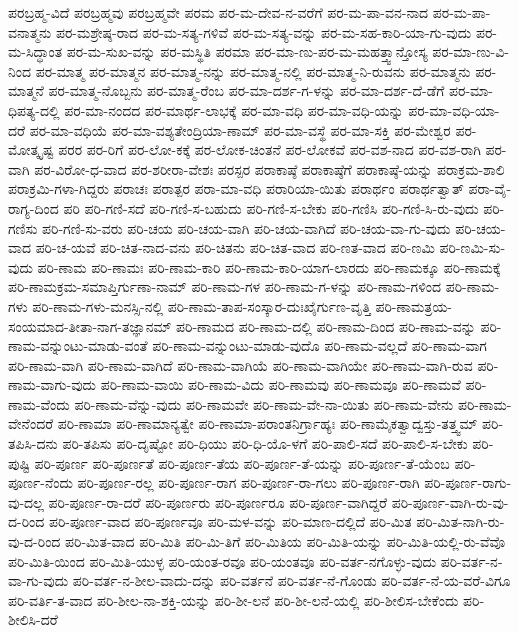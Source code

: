 {ಪರಬ್ರಹ್ಮ-ವಿದೆ
ಪರಬ್ರಹ್ಮವು
ಪರಬ್ರಹ್ಮವೇ
ಪರಮ
ಪರ-ಮ-ದೇವ-ನ-ವರೆಗೆ
ಪರ-ಮ-ಪಾ-ವನ-ನಾದ
ಪರ-ಮ-ಪಾ-ವನಾತ್ಮನು
ಪರ-ಮಶ್ರೇಷ್ಠ-ರಾದ
ಪರ-ಮ-ಸತ್ಯ-ಗಳಿವೆ
ಪರ-ಮ-ಸತ್ಯ-ವನ್ನು
ಪರ-ಮ-ಸಹ-ಕಾರಿ-ಯಾ-ಗು-ವುದು
ಪರ-ಮ-ಸಿದ್ಧಾಂತ
ಪರ-ಮ-ಸುಖ-ವನ್ನು
ಪರ-ಮಸ್ಥಿತಿ
ಪರಮಾ
ಪರ-ಮಾ-ಣು-ಪರ-ಮ-ಮಹತ್ತ್ವಾನ್ತೋಸ್ಯ
ಪರ-ಮಾ-ಣು-ವಿ-ನಿಂದ
ಪರ-ಮಾತ್ಮ
ಪರ-ಮಾತ್ಮನ
ಪರ-ಮಾತ್ಮ-ನನ್ನು
ಪರ-ಮಾತ್ಮ-ನಲ್ಲಿ
ಪರ-ಮಾತ್ಮ-ನಿ-ರುವನು
ಪರ-ಮಾತ್ಮನು
ಪರ-ಮಾತ್ಮನೆ
ಪರ-ಮಾತ್ಮ-ನೊಬ್ಬನು
ಪರ-ಮಾತ್ಮ-ರೆಂಬ
ಪರ-ಮಾ-ದರ್ಶ-ಗ-ಳನ್ನು
ಪರ-ಮಾ-ದರ್ಶ-ದೆ-ಡೆಗೆ
ಪರ-ಮಾ-ಧಿಪತ್ಯ-ದಲ್ಲಿ
ಪರ-ಮಾ-ನಂದದ
ಪರ-ಮಾರ್ಥ-ಲಾಭಕ್ಕೆ
ಪರ-ಮಾ-ವಧಿ
ಪರ-ಮಾ-ವಧಿ-ಯನ್ನು
ಪರ-ಮಾ-ವಧಿ-ಯಾ-ದರೆ
ಪರ-ಮಾ-ವಧಿಯೆ
ಪರ-ಮಾ-ವಶ್ಯತೇಂದ್ರಿಯಾ-ಣಾಮ್
ಪರ-ಮಾ-ವಸ್ಥೆ
ಪರ-ಮಾ-ಸಕ್ತಿ
ಪರ-ಮೇಶ್ವರ
ಪರ-ಮೋತ್ಕೃಷ್ಟ
ಪರರ
ಪರ-ರಿಗೆ
ಪರ-ಲೋ-ಕಕ್ಕೆ
ಪರ-ಲೋಕ-ಚಿಂತನೆ
ಪರ-ಲೋಕವೆ
ಪರ-ವಶ-ನಾದ
ಪರ-ವಶ-ರಾಗಿ
ಪರ-ವಾಗಿ
ಪರ-ವಿರೋ-ಧ-ವಾದ
ಪರ-ಶರೀರಾ-ವೇಶಃ
ಪರಸ್ಪರ
ಪರಾಕಾಷ್ಠೆ
ಪರಾಕಾಷ್ಠೆಗೆ
ಪರಾಕಾಷ್ಠೆ-ಯನ್ನು
ಪರಾಕ್ರಮ-ಶಾಲಿ
ಪರಾಕ್ರಮಿ-ಗಳಾ-ಗಿದ್ದರು
ಪರಾಚಃ
ಪರಾತ್ಪರ
ಪರಾ-ಮಾ-ವಧಿ
ಪರಾರಿಯಾ-ಯಿತು
ಪರಾರ್ಥಂ
ಪರಾರ್ಥತ್ವಾತ್
ಪರಾ-ವೈ-ರಾಗ್ಯ-ದಿಂದ
ಪರಿ
ಪರಿ-ಗಣಿ-ಸದೆ
ಪರಿ-ಗಣಿ-ಸ-ಬಹುದು
ಪರಿ-ಗಣಿ-ಸ-ಬೇಕು
ಪರಿ-ಗಣಿಸಿ
ಪರಿ-ಗಣಿ-ಸಿ-ರು-ವುದು
ಪರಿ-ಗಣಿಸು
ಪರಿ-ಗಣಿ-ಸು-ವರು
ಪರಿ-ಚಯ
ಪರಿ-ಚಯ-ವಾಗಿ
ಪರಿ-ಚಯ-ವಾಗಿದೆ
ಪರಿ-ಚಯ-ವಾ-ಗು-ವುದು
ಪರಿ-ಚಯ-ವಾದ
ಪರಿ-ಚ-ಯವೆ
ಪರಿ-ಚಿತ-ನಾದ-ವನು
ಪರಿ-ಚಿತನು
ಪರಿ-ಚಿತ-ವಾದ
ಪರಿ-ಣತ-ವಾದ
ಪರಿ-ಣಮಿ
ಪರಿ-ಣಮಿ-ಸು-ವುದು
ಪರಿ-ಣಾಮ
ಪರಿ-ಣಾಮಃ
ಪರಿ-ಣಾಮ-ಕಾರಿ
ಪರಿ-ಣಾಮ-ಕಾರಿ-ಯಾಗ-ಲಾರದು
ಪರಿ-ಣಾಮಕ್ಕೂ
ಪರಿ-ಣಾಮಕ್ಕೆ
ಪರಿ-ಣಾಮಕ್ರಮ-ಸಮಾಪ್ತಿರ್ಗುಣಾ-ನಾಮ್
ಪರಿ-ಣಾಮ-ಗಳ
ಪರಿ-ಣಾಮ-ಗ-ಳನ್ನು
ಪರಿ-ಣಾಮ-ಗಳಿಂದ
ಪರಿ-ಣಾಮ-ಗಳು
ಪರಿ-ಣಾಮ-ಗಳು-ಮನಸ್ಸಿ-ನಲ್ಲಿ
ಪರಿ-ಣಾಮ-ತಾಪ-ಸಂಸ್ಕಾರ-ದುಃಖೈರ್ಗುಣ-ವೃತ್ತಿ
ಪರಿ-ಣಾಮತ್ರಯ-ಸಂಯಮಾದ-ತೀತಾ-ನಾಗ-ತಜ್ಞಾನಮ್
ಪರಿ-ಣಾಮದ
ಪರಿ-ಣಾಮ-ದಲ್ಲಿ
ಪರಿ-ಣಾಮ-ದಿಂದ
ಪರಿ-ಣಾಮ-ವನ್ನು
ಪರಿ-ಣಾಮ-ವನ್ನುಂಟು-ಮಾಡು-ವಂತೆ
ಪರಿ-ಣಾಮ-ವನ್ನುಂಟು-ಮಾಡು-ವುದೊ
ಪರಿ-ಣಾಮ-ವಲ್ಲದೆ
ಪರಿ-ಣಾಮ-ವಾಗ
ಪರಿ-ಣಾಮ-ವಾಗಿ
ಪರಿ-ಣಾಮ-ವಾಗಿದೆ
ಪರಿ-ಣಾಮ-ವಾಗಿಯೆ
ಪರಿ-ಣಾಮ-ವಾಗಿಯೇ
ಪರಿ-ಣಾಮ-ವಾಗಿ-ರುವ
ಪರಿ-ಣಾಮ-ವಾಗು-ವುದು
ಪರಿ-ಣಾಮ-ವಾಯಿ
ಪರಿ-ಣಾಮ-ವಿದು
ಪರಿ-ಣಾಮವು
ಪರಿ-ಣಾಮವೂ
ಪರಿ-ಣಾಮವೆ
ಪರಿ-ಣಾಮ-ವೆಂದು
ಪರಿ-ಣಾಮ-ವೆನ್ನು-ವುದು
ಪರಿ-ಣಾಮವೇ
ಪರಿ-ಣಾಮ-ವೇ-ನಾ-ಯಿತು
ಪರಿ-ಣಾಮ-ವೇನು
ಪರಿ-ಣಾಮ-ವೇನೆಂದರೆ
ಪರಿ-ಣಾಮಾ
ಪರಿ-ಣಾಮಾನ್ಯತ್ವೇ
ಪರಿ-ಣಾಮಾ-ಪರಾಂತನಿರ್ಗ್ರಾಹ್ಯಃ
ಪರಿ-ಣಾಮೈಕತ್ವಾದ್ವಸ್ತು-ತತ್ತ್ವಮ್
ಪರಿ-ತಪಿಸಿ-ದನು
ಪರಿ-ತಪಿಸು
ಪರಿ-ದೃಷ್ಟೋ
ಪರಿ-ಧಿಯು
ಪರಿ-ಧಿ-ಯೊ-ಳಗೆ
ಪರಿ-ಪಾಲಿ-ಸದೆ
ಪರಿ-ಪಾಲಿ-ಸ-ಬೇಕು
ಪರಿ-ಪುಷ್ಟಿ
ಪರಿ-ಪೂರ್ಣ
ಪರಿ-ಪೂರ್ಣತೆ
ಪರಿ-ಪೂರ್ಣ-ತೆಯ
ಪರಿ-ಪೂರ್ಣ-ತೆ-ಯನ್ನು
ಪರಿ-ಪೂರ್ಣ-ತೆ-ಯೆಂಬ
ಪರಿ-ಪೂರ್ಣ-ನೆಂದು
ಪರಿ-ಪೂರ್ಣ-ರಲ್ಲ
ಪರಿ-ಪೂರ್ಣ-ರಾಗ
ಪರಿ-ಪೂರ್ಣ-ರಾ-ಗಲು
ಪರಿ-ಪೂರ್ಣ-ರಾಗಿ
ಪರಿ-ಪೂರ್ಣ-ರಾಗು-ವು-ದಲ್ಲ
ಪರಿ-ಪೂರ್ಣ-ರಾ-ದರೆ
ಪರಿ-ಪೂರ್ಣರು
ಪರಿ-ಪೂರ್ಣರೂ
ಪರಿ-ಪೂರ್ಣ-ವಾಗಿದ್ದರೆ
ಪರಿ-ಪೂರ್ಣ-ವಾಗಿ-ರು-ವು-ದ-ರಿಂದ
ಪರಿ-ಪೂರ್ಣ-ವಾದ
ಪರಿ-ಪೂರ್ಣವೂ
ಪರಿ-ಮಳ-ವನ್ನು
ಪರಿ-ಮಾಣ-ದಲ್ಲಿದೆ
ಪರಿ-ಮಿತ
ಪರಿ-ಮಿತ-ನಾಗಿ-ರು-ವು-ದ-ರಿಂದ
ಪರಿ-ಮಿತ-ವಾದ
ಪರಿ-ಮಿತಿ
ಪರಿ-ಮಿ-ತಿಗೆ
ಪರಿ-ಮಿತಿಯ
ಪರಿ-ಮಿತಿ-ಯನ್ನು
ಪರಿ-ಮಿತಿ-ಯಲ್ಲಿ-ರು-ವೆವೊ
ಪರಿ-ಮಿತಿ-ಯಿಂದ
ಪರಿ-ಮಿತಿ-ಯುಳ್ಳ
ಪರಿ-ಯಂತ-ರವೂ
ಪರಿ-ಯಂತವೂ
ಪರಿ-ವರ್ತ-ನಗೊಳ್ಳು-ವುದು
ಪರಿ-ವರ್ತ-ನ-ವಾ-ಗು-ವುದು
ಪರಿ-ವರ್ತ-ನ-ಶೀಲ-ವಾದು-ದನ್ನು
ಪರಿ-ವರ್ತನೆ
ಪರಿ-ವರ್ತ-ನೆ-ಗೊಂಡು
ಪರಿ-ವರ್ತ-ನೆ-ಯ-ವರೆ-ವಿಗೂ
ಪರಿ-ವರ್ತಿ-ತ-ವಾದ
ಪರಿ-ಶೀಲ-ನಾ-ಶಕ್ತಿ-ಯನ್ನು
ಪರಿ-ಶೀ-ಲನೆ
ಪರಿ-ಶೀ-ಲನೆ-ಯಲ್ಲಿ
ಪರಿ-ಶೀಲಿಸ-ಬೇಕೆಂದು
ಪರಿ-ಶೀಲಿಸಿ-ದರೆ
}
